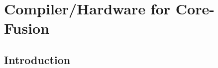 \chapter{Compiler/Hardware for Core-Fusion}

\section{Introduction}\label{sect:introduction-chapter3}


